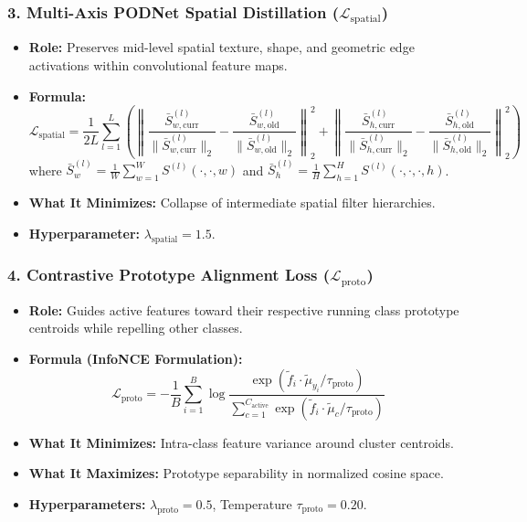 \documentclass[11pt,a4paper]{article}
\begin{document}
    \subsubsection{3. Multi-Axis PODNet Spatial Distillation ($\mathcal{L}_{\text{spatial}}$)}
    \begin{itemize}[leftmargin=*]
        \item \textbf{Role:} Preserves mid-level spatial texture, shape, and geometric edge activations within convolutional feature maps.
        \item \textbf{Formula:}
        \begin{equation}
            \mathcal{L}_{\text{spatial}} = \frac{1}{2 L} \sum_{l=1}^{L} \left( \left\| \frac{\bar{S}_{w, \text{curr}}^{(l)}}{\|\bar{S}_{w, \text{curr}}^{(l)}\|_2} - \frac{\bar{S}_{w, \text{old}}^{(l)}}{\|\bar{S}_{w, \text{old}}^{(l)}\|_2} \right\|_2^2 + \left\| \frac{\bar{S}_{h, \text{curr}}^{(l)}}{\|\bar{S}_{h, \text{curr}}^{(l)}\|_2} - \frac{\bar{S}_{h, \text{old}}^{(l)}}{\|\bar{S}_{h, \text{old}}^{(l)}\|_2} \right\|_2^2 \right)
        \end{equation}
        where $\bar{S}_w^{(l)} = \frac{1}{W} \sum_{w=1}^{W} S^{(l)}(\cdot, \cdot, w)$ and $\bar{S}_h^{(l)} = \frac{1}{H} \sum_{h=1}^{H} S^{(l)}(\cdot, \cdot, \cdot, h)$.
        \item \textbf{What It Minimizes:} Collapse of intermediate spatial filter hierarchies.
        \item \textbf{Hyperparameter:} $\lambda_{\text{spatial}} = 1.5$.
    \end{itemize}

    \subsubsection{4. Contrastive Prototype Alignment Loss ($\mathcal{L}_{\text{proto}}$)}
    \begin{itemize}[leftmargin=*]
        \item \textbf{Role:} Guides active features toward their respective running class prototype centroids while repelling other classes.
        \item \textbf{Formula (InfoNCE Formulation):}
        \begin{equation}
            \mathcal{L}_{\text{proto}} = - \frac{1}{B} \sum_{i=1}^{B} \log \frac{\exp(\tilde{f}_i \cdot \tilde{\mu}_{y_i} / \tau_{\text{proto}})}{\sum_{c=1}^{C_{\text{active}}} \exp(\tilde{f}_i \cdot \tilde{\mu}_c / \tau_{\text{proto}})}
        \end{equation}
        \item \textbf{What It Minimizes:} Intra-class feature variance around cluster centroids.
        \item \textbf{What It Maximizes:} Prototype separability in normalized cosine space.
        \item \textbf{Hyperparameters:} $\lambda_{\text{proto}} = 0.5$, Temperature $\tau_{\text{proto}} = 0.20$.
    \end{itemize}
\end{document}
